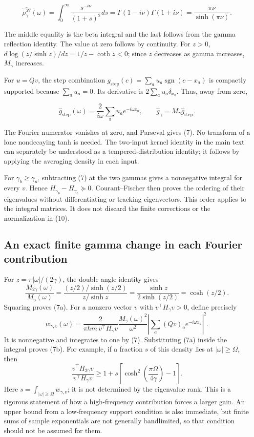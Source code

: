\documentclass[11pt]{article}
\begin{document}
\[
\widehat{\rho_\gamma^{\mathrm{av}}}(\omega)
=\int_0^\infty\frac{s^{-i\nu}}{(1+s)^2}ds
=\Gamma(1-i\nu)\Gamma(1+i\nu)
=\frac{\pi\nu}{\sinh(\pi\nu)}.
\]

The middle equality is the beta integral and the last follows from the gamma reflection identity. The value at zero follows by continuity. For \(z>0\), \(d\log(z/\sinh z)/dz=1/z-\coth z<0\); since \(z\) decreases as gamma increases, \(M_\gamma\) increases.

For \(u=Qv\), the step combination \(g_{\mathrm{step}}(c)=\sum_a u_a\operatorname{sgn}(c-x_a)\) is compactly supported because \(\sum_a u_a=0\). Its derivative is \(2\sum_a u_a\delta_{x_a}\). Thus, away from zero,

\[
\widehat g_{\mathrm{step}}(\omega)
=\frac{2}{i\omega}\sum_a u_a e^{-i\omega x_a},
\qquad
\widehat g_\gamma=M_\gamma\widehat g_{\mathrm{step}}.
\]

The Fourier numerator vanishes at zero, and Parseval gives (7). No transform of a lone nondecaying tanh is needed. The two-input kernel identity in the main text can separately be understood as a tempered-distribution identity; it follows by applying the averaging density in each input.

For \(\gamma_b\ge\gamma_a\), subtracting (7) at the two gammas gives a nonnegative integral for every \(v\). Hence \(H_{\gamma_b}-H_{\gamma_a}\succeq0\). Courant--Fischer then proves the ordering of their eigenvalues without differentiating or tracking eigenvectors. This order applies to the integral matrices. It does not discard the finite corrections or the normalization in (10).


\subsection{An exact finite gamma change in each Fourier contribution}

For \(z=\pi|\omega|/(2\gamma)\), the double-angle identity gives
\[
\frac{M_{2\gamma}(\omega)}{M_\gamma(\omega)}
=\frac{(z/2)/\sinh(z/2)}{z/\sinh z}
=\frac{\sinh z}{2\sinh(z/2)}=\cosh(z/2).
\]
Squaring proves (7a). For a nonzero vector \(v\) with \(v^\top H_\gamma v>0\), define precisely
\[
w_{\gamma,v}(\omega)=
\frac{2}{\pi hm\,v^\top H_\gamma v}
\frac{M_\gamma(\omega)^2}{\omega^2}
\left|\sum_a(Qv)_ae^{-i\omega x_a}\right|^2.
\tag{B1}
\]
It is nonnegative and integrates to one by (7). Substituting (7a) inside the integral proves (7b). For example, if a fraction \(s\) of this density lies at \(|\omega|\ge\Omega\), then
\[
\frac{v^\top H_{2\gamma}v}{v^\top H_\gamma v}
\ge 1+s\left[\cosh^2\!\left(\frac{\pi\Omega}{4\gamma}\right)-1\right].
\tag{B2}
\]
Here \(s=\int_{|\omega|\ge\Omega}w_{\gamma,v}\); it is not determined by the eigenvalue rank. This is a rigorous statement of how a high-frequency contribution forces a larger gain. An upper bound from a low-frequency support condition is also immediate, but finite sums of sample exponentials are not generally bandlimited, so that condition should not be assumed for them.
\end{document}
